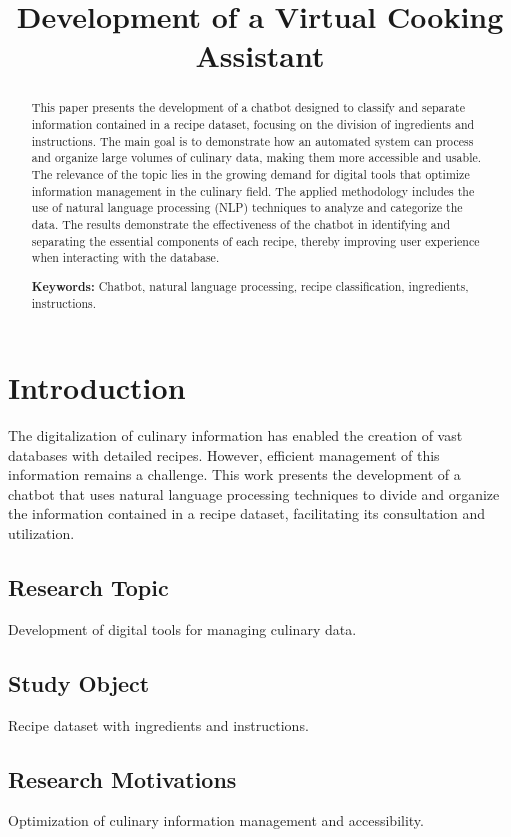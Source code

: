 \documentclass[conference]{IEEEtran}
\title{Development of a Virtual Cooking Assistant}
\author{
    \IEEEauthorblockN{Hugo Mojica Angarita, Camila Rincón Rojas}
    \IEEEauthorblockA{
        \textit{Universidad Distrital FJC} \\
        Bogotá, Colombia \\
        hmojicaa@udistrital.edu.co, jcrinconr@udistrital.edu.co
    }
}
\begin{document}
\maketitle

\begin{abstract}
This paper presents the development of a chatbot designed to classify and separate information contained in a recipe dataset, focusing on the division of ingredients and instructions. The main goal is to demonstrate how an automated system can process and organize large volumes of culinary data, making them more accessible and usable. The relevance of the topic lies in the growing demand for digital tools that optimize information management in the culinary field. The applied methodology includes the use of natural language processing (NLP) techniques to analyze and categorize the data. The results demonstrate the effectiveness of the chatbot in identifying and separating the essential components of each recipe, thereby improving user experience when interacting with the database.

\textbf{Keywords:} Chatbot, natural language processing, recipe classification, ingredients, instructions.
\end{abstract}

\section{Introduction}
The digitalization of culinary information has enabled the creation of vast databases with detailed recipes. However, efficient management of this information remains a challenge. This work presents the development of a chatbot that uses natural language processing techniques to divide and organize the information contained in a recipe dataset, facilitating its consultation and utilization.

\subsection{Research Topic}
Development of digital tools for managing culinary data.

\subsection{Study Object}
Recipe dataset with ingredients and instructions.

\subsection{Research Motivations}
Optimization of culinary information management and accessibility.
\end{document}
